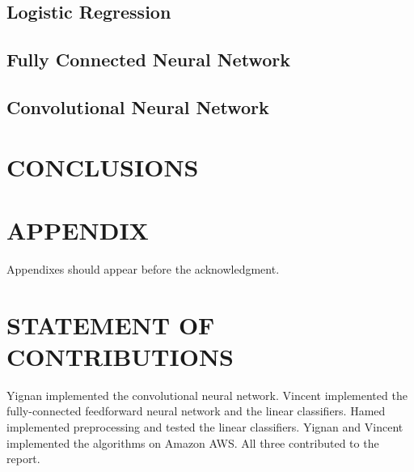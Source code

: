 \documentclass[letterpaper, 10 pt, conference]{ieeeconf}  %
\begin{document}
\subsection{Logistic Regression}

\subsection{Fully Connected Neural Network}

\subsection{Convolutional Neural Network}



\section{CONCLUSIONS}


\addtolength{\textheight}{-12cm}   %







\section*{APPENDIX}

Appendixes should appear before the acknowledgment.

\section*{STATEMENT OF CONTRIBUTIONS}
Yignan implemented the convolutional neural network.
Vincent implemented the fully-connected feedforward neural
network and the linear classifiers. Hamed implemented preprocessing and tested the linear classifiers. Yignan and Vincent implemented the algorithms on Amazon AWS. All three contributed to the report.
\end{document}
